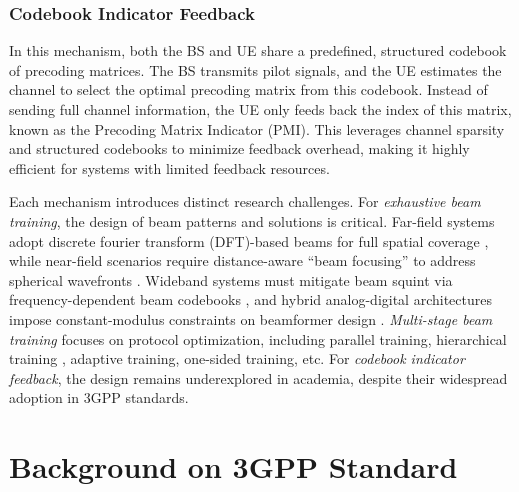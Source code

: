 \documentclass[lettersize,journal]{IEEEtran}
\begin{document}
\subsubsection{Codebook Indicator Feedback}  
In this mechanism, both the BS and UE share a predefined, structured codebook of precoding matrices. The BS transmits pilot signals, and the UE estimates the channel to select the optimal precoding matrix from this codebook. Instead of sending full channel information, the UE only feeds back the index of this matrix, known as the Precoding Matrix Indicator (PMI). This leverages channel sparsity and structured codebooks to minimize feedback overhead, making it highly efficient for systems with limited feedback resources\cite{huang2006performance, mo2015limited, inoue2007kerdock}. 

Each mechanism introduces distinct research challenges. For \emph{exhaustive beam training}, the design of beam patterns and solutions is critical. Far-field systems adopt discrete fourier transform (DFT)-based beams for full spatial coverage \cite{xiaocodebook, dreifuerst2022massive}, while near-field scenarios require distance-aware ``beam focusing'' to address spherical wavefronts \cite{nearfild,kangjian,XL2}. Wideband systems must mitigate beam squint via frequency-dependent beam codebooks \cite{ningcodebookwide,codebooksquint,chensquint}, and hybrid analog-digital architectures impose constant-modulus constraints on beamformer design \cite{ningexh,hybridcode,chenhybrid}. \emph{Multi-stage beam training} focuses on protocol optimization, including parallel training\cite{paralel},  hierarchical training \cite{qichenhao}, adaptive training\cite{adaptive}, one-sided training\cite{oneside}, etc. For \emph{codebook indicator feedback}, the design remains underexplored in academia, despite their widespread adoption in 3GPP standards.

\section{Background on 3GPP Standard}\label{3gppcodebook}
\end{document}
